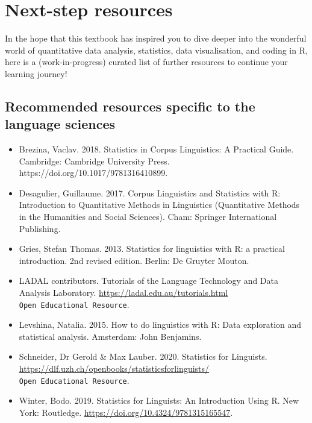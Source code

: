 \documentclass[
  letterpaper,
  DIV=11,
  numbers=noendperiod,
  oneside]{scrreprt}
\begin{document}
\cleardoublepage
{}
{}
\appendix

\chapter{Next-step resources}\label{next-step-resources}

In the hope that this textbook has inspired you to dive deeper into the
wonderful world of quantitative data analysis, statistics, data
visualisation, and coding in R, here is a (work-in-progress) curated
list of further resources to continue your learning journey! 🚀✨

\section{Recommended resources specific to the language
sciences}\label{recommended-resources-specific-to-the-language-sciences}

\begin{itemize}
\item
  Brezina, Vaclav. 2018. Statistics in Corpus Linguistics: A Practical
  Guide. Cambridge: Cambridge University Press.
  https://doi.org/10.1017/9781316410899.
\item
  Desagulier, Guillaume. 2017. Corpus Linguistics and Statistics with R:
  Introduction to Quantitative Methods in Linguistics (Quantitative
  Methods in the Humanities and Social Sciences). Cham: Springer
  International Publishing.
\item
  Gries, Stefan Thomas. 2013. Statistics for linguistics with R: a
  practical introduction. 2nd revised edition. Berlin: De Gruyter
  Mouton.
\item
  LADAL contributors. Tutorials of the Language Technology and Data
  Analysis Laboratory. \url{https://ladal.edu.au/tutorials.html}
  \texttt{Open\ Educational\ Resource}.
\item
  Levshina, Natalia. 2015. How to do linguistics with R: Data
  exploration and statistical analysis. Amsterdam: John Benjamins.
\item
  Schneider, Dr Gerold \& Max Lauber. 2020. Statistics for Linguists.
  \url{https://dlf.uzh.ch/openbooks/statisticsforlinguists/}
  \texttt{Open\ Educational\ Resource}.
\item
  Winter, Bodo. 2019. Statistics for Linguists: An Introduction Using R.
  New York: Routledge.
  \href{https://doi.org/10.1017/9781316410899}{https://doi.org/10.4324/9781315165547}.
\end{itemize}
\end{document}
